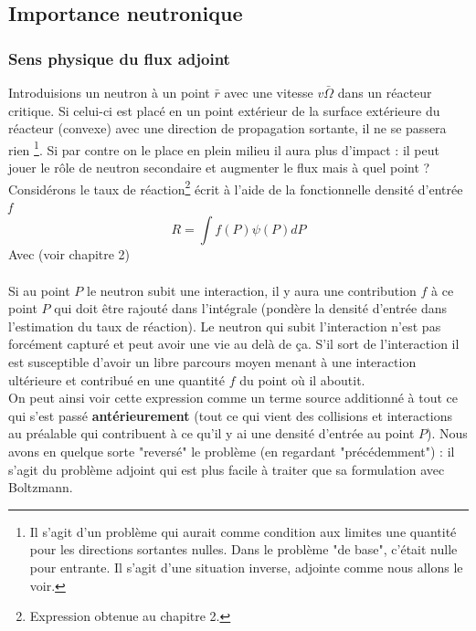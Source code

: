 	\subsection{Importance neutronique}
		\subsubsection{Sens physique du flux adjoint}
		Introduisions un neutron à un point $\bar r$ avec une vitesse $v\bar\Omega$ dans un 
		réacteur critique. Si celui-ci est placé en un point extérieur de la surface extérieure du
		réacteur (convexe) avec une direction de propagation sortante, il ne se passera rien
		\footnote{Il s'agit d'un problème qui aurait comme condition aux limites une quantité 
		pour les directions sortantes nulles. Dans le problème "de base", c'était nulle pour 
		entrante. Il s'agit d'une situation inverse, adjointe comme nous allons le voir.}. Si par
		contre on le place en plein milieu il aura plus d'impact : il peut jouer le rôle de 
		neutron secondaire et augmenter le flux mais à quel point ? Considérons le taux de 
		réaction\footnote{Expression obtenue au chapitre 2.} écrit à l'aide de la fonctionnelle 
		densité d'entrée \textit{f}
		\begin{equation}
		R = \int {  f(P)\psi (P)dP} 
		\end{equation}
		Avec (voir chapitre 2)\\
		
		\ \\
		
		Si au point $P$ le neutron subit une interaction, il y aura une contribution $f$ à ce point 
		$P$ qui doit être rajouté dans l'intégrale (pondère la densité d'entrée dans l'estimation du
		taux de réaction). Le neutron qui subit l'interaction n'est pas forcément capturé et peut 
		avoir une vie au delà de ça. S'il sort de l'interaction il est susceptible d'avoir un libre
		parcours moyen menant à une interaction ultérieure et contribué en une quantité $f$ du 
		point où il aboutit. \\

		On peut ainsi voir cette expression comme un terme source additionné à tout ce qui s'est passé
		\textbf{antérieurement} (tout ce qui vient des collisions et interactions au préalable qui 
		contribuent à ce qu'il y ai une densité d'entrée au point $P$). Nous avons en quelque sorte 
		"reversé" le problème (en regardant "précédemment") : il s'agit du problème adjoint qui est 
		plus facile à traiter que sa formulation avec Boltzmann.\\
		
